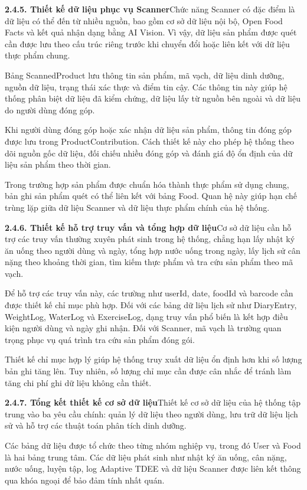 \textbf{2.4.5. Thiết kế dữ liệu phục vụ Scanner}Chức năng Scanner có đặc điểm là dữ liệu có thể đến từ nhiều nguồn, bao gồm cơ sở dữ liệu nội bộ, Open Food Facts và kết quả nhận dạng bằng AI Vision. Vì vậy, dữ liệu sản phẩm được quét cần được lưu theo cấu trúc riêng trước khi chuyển đổi hoặc liên kết với dữ liệu thực phẩm chung.

Bảng ScannedProduct lưu thông tin sản phẩm, mã vạch, dữ liệu dinh dưỡng, nguồn dữ liệu, trạng thái xác thực và điểm tin cậy. Các thông tin này giúp hệ thống phân biệt dữ liệu đã kiểm chứng, dữ liệu lấy từ nguồn bên ngoài và dữ liệu do người dùng đóng góp.

Khi người dùng đóng góp hoặc xác nhận dữ liệu sản phẩm, thông tin đóng góp được lưu trong ProductContribution. Cách thiết kế này cho phép hệ thống theo dõi nguồn gốc dữ liệu, đối chiếu nhiều đóng góp và đánh giá độ ổn định của dữ liệu sản phẩm theo thời gian.

Trong trường hợp sản phẩm được chuẩn hóa thành thực phẩm sử dụng chung, bản ghi sản phẩm quét có thể liên kết với bảng Food. Quan hệ này giúp hạn chế trùng lặp giữa dữ liệu Scanner và dữ liệu thực phẩm chính của hệ thống.

\textbf{2.4.6. Thiết kế hỗ trợ truy vấn và tổng hợp dữ liệu}Cơ sở dữ liệu cần hỗ trợ các truy vấn thường xuyên phát sinh trong hệ thống, chẳng hạn lấy nhật ký ăn uống theo người dùng và ngày, tổng hợp nước uống trong ngày, lấy lịch sử cân nặng theo khoảng thời gian, tìm kiếm thực phẩm và tra cứu sản phẩm theo mã vạch.

Để hỗ trợ các truy vấn này, các trường như userId, date, foodId và barcode cần được thiết kế chỉ mục phù hợp. Đối với các bảng dữ liệu lịch sử như DiaryEntry, WeightLog, WaterLog và ExerciseLog, dạng truy vấn phổ biến là kết hợp điều kiện người dùng và ngày ghi nhận. Đối với Scanner, mã vạch là trường quan trọng phục vụ quá trình tra cứu sản phẩm đóng gói.

Thiết kế chỉ mục hợp lý giúp hệ thống truy xuất dữ liệu ổn định hơn khi số lượng bản ghi tăng lên. Tuy nhiên, số lượng chỉ mục cần được cân nhắc để tránh làm tăng chi phí ghi dữ liệu không cần thiết.

\textbf{2.4.7. Tổng kết thiết kế cơ sở dữ liệu}Thiết kế cơ sở dữ liệu của hệ thống tập trung vào ba yêu cầu chính: quản lý dữ liệu theo người dùng, lưu trữ dữ liệu lịch sử và hỗ trợ các thuật toán phân tích dinh dưỡng.

Các bảng dữ liệu được tổ chức theo từng nhóm nghiệp vụ, trong đó User và Food là hai bảng trung tâm. Các dữ liệu phát sinh như nhật ký ăn uống, cân nặng, nước uống, luyện tập, log Adaptive TDEE và dữ liệu Scanner được liên kết thông qua khóa ngoại để bảo đảm tính nhất quán.

